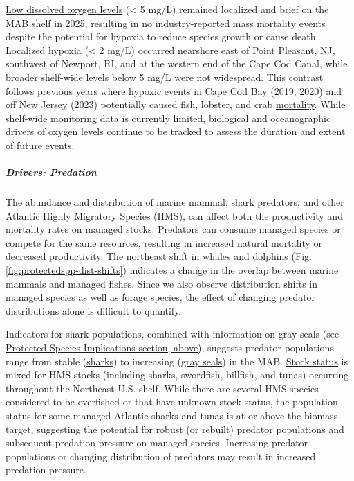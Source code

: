 \documentclass[
  10pt,
]{article}
\begin{document}
\href{https://noaa-edab.github.io/catalog/dissolved_oxygen.html}{Low
dissolved oxygen levels} (\textless{} 5 mg/L) remained localized and
brief on the
\href{https://noaa-edab.github.io/catalog/observation_synthesis_2023.html}{MAB
shelf in 2025}, resulting in no industry-reported mass mortality events
despite the potential for hypoxia to reduce species growth or cause
death. Localized hypoxia (\textless{} 2 mg/L) occurred nearshore east of
Point Pleasant, NJ, southwest of Newport, RI, and at the western end of
the Cape Cod Canal, while broader shelf-wide levels below 5 mg/L were
not widespread. This contrast follows previous years where
\href{https://noaa-edab.github.io/catalog/observation_synthesis_2023.html}{hypoxic}
events in Cape Cod Bay (2019, 2020) and off New Jersey (2023)
potentially caused fish, lobster, and crab
\href{https://sebsnjaesnews.rutgers.edu/2023/12/rutgers-scientists-observe-unusual-ocean-conditions-possibly-linked-to-mortality-in-marine-life-off-new-jersey/}{mortality}.
While shelf-wide monitoring data is currently limited, biological and
oceanographic drivers of oxygen levels continue to be tracked to assess
the duration and extent of future events.

\subparagraph{Drivers: Predation}\label{drivers-predation}

The abundance and distribution of marine mammal, shark predators, and
other Atlantic Highly Migratory Species (HMS), can affect both the
productivity and mortality rates on managed stocks. Predators can
consume managed species or compete for the same resources, resulting in
increased natural mortality or decreased productivity. The northeast
shift in
\href{https://noaa-edab.github.io/catalog/cetacean_dist.html}{whales and
dolphins} (Fig. \ref{fig:protectedspp-dist-shifts}) indicates a change
in the overlap between marine mammals and managed fishes. Since we also
observe distribution shifts in managed species as well as forage
species, the effect of changing predator distributions alone is
difficult to quantify.

Indicators for shark populations, combined with information on gray
seals (see \hyperref[protected-species]{Protected Species Implications
section, above}), suggests predator populations range from stable
(\href{https://noaa-edab.github.io/catalog/hms_cpue.html}{sharks}) to
increasing
(\href{https://noaa-edab.github.io/catalog/seal_pups.html}{gray seals})
in the MAB.
\href{https://noaa-edab.github.io/catalog/hms_stock_status.html}{Stock
status} is mixed for HMS stocks (including sharks, swordfish, billfish,
and tunas) occurring throughout the Northeast U.S. shelf. While there
are several HMS species considered to be overfished or that have unknown
stock status, the population status for some managed Atlantic sharks and
tunas is at or above the biomass target, suggesting the potential for
robust (or rebuilt) predator populations and subsequent predation
pressure on managed species. Increasing predator populations or changing
distribution of predators may result in increased predation pressure.
\end{document}
